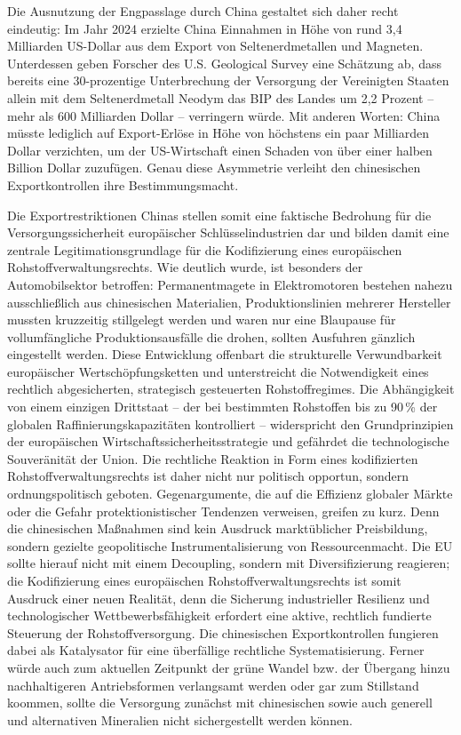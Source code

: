 \documentclass[12pt,a4paper,oneside]{book} %
\begin{document}
Die Ausnutzung der Engpasslage durch China gestaltet sich daher recht eindeutig: Im Jahr 2024 erzielte China Einnahmen in Höhe von rund 3,4 Milliarden US-Dollar aus dem Export von Seltenerdmetallen und Magneten. Unterdessen geben Forscher des U.S. Geological Survey eine Schätzung ab, dass bereits eine 30-prozentige Unterbrechung der Versorgung der Vereinigten Staaten allein mit dem Seltenerdmetall Neodym das BIP des Landes um 2,2 Prozent – mehr als 600 Milliarden Dollar – verringern würde. Mit anderen Worten: China müsste lediglich auf Export-Erlöse in Höhe von höchstens ein paar Milliarden Dollar verzichten, um der US-Wirtschaft einen Schaden von über einer halben Billion Dollar zuzufügen.\autocite{Fishman} Genau diese Asymmetrie verleiht den chinesischen Exportkontrollen ihre Bestimmungsmacht.

Die Exportrestriktionen Chinas stellen somit eine faktische Bedrohung für die Versorgungssicherheit europäischer Schlüsselindustrien dar und bilden damit eine zentrale Legitimationsgrundlage für die Kodifizierung eines europäischen Rohstoffverwaltungsrechts. Wie deutlich wurde, ist besonders der Automobilsektor betroffen: Permanentmagete in Elektromotoren bestehen nahezu ausschließlich aus chinesischen Materialien, Produktionslinien mehrerer Hersteller mussten kruzzeitig stillgelegt werden und waren nur eine Blaupause für vollumfängliche Produktionsausfälle die drohen, sollten Ausfuhren gänzlich eingestellt werden.
Diese Entwicklung offenbart die strukturelle Verwundbarkeit europäischer Wertschöpfungsketten und unterstreicht die Notwendigkeit eines rechtlich abgesicherten, strategisch gesteuerten Rohstoffregimes. Die Abhängigkeit von einem einzigen Drittstaat -- der bei bestimmten Rohstoffen bis zu 90 \% der globalen Raffinierungskapazitäten kontrolliert -- widerspricht den Grundprinzipien der europäischen Wirtschaftssicherheitsstrategie und gefährdet die technologische Souveränität der Union. Die rechtliche Reaktion in Form eines kodifizierten Rohstoffverwaltungsrechts ist daher nicht nur politisch opportun, sondern ordnungspolitisch geboten. Gegenargumente, die auf die Effizienz globaler Märkte oder die Gefahr protektionistischer Tendenzen verweisen, greifen zu kurz. Denn die chinesischen Maßnahmen sind kein Ausdruck marktüblicher Preisbildung, sondern gezielte geopolitische Instrumentalisierung von Ressourcenmacht. Die EU sollte hierauf nicht mit einem Decoupling, sondern mit Diversifizierung reagieren; die Kodifizierung eines europäischen Rohstoffverwaltungsrechts ist somit Ausdruck einer neuen Realität, denn die Sicherung industrieller Resilienz und technologischer Wettbewerbsfähigkeit erfordert eine aktive, rechtlich fundierte Steuerung der Rohstoffversorgung. Die chinesischen Exportkontrollen fungieren dabei als Katalysator für eine überfällige rechtliche Systematisierung. Ferner würde auch zum aktuellen Zeitpunkt der grüne Wandel bzw. der Übergang hinzu nachhaltigeren Antriebsformen verlangsamt werden oder gar zum Stillstand koommen, sollte die Versorgung zunächst mit chinesischen sowie auch generell und alternativen Mineralien nicht sichergestellt werden können.
\end{document}
